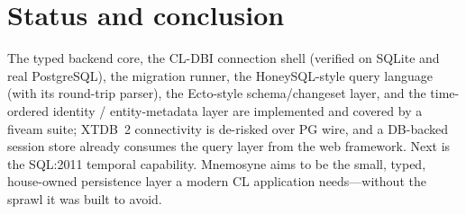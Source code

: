 \documentclass[11pt,a4paper]{article}
\begin{document}
\section{Status and conclusion}
\label{sec:conclusion}
The typed backend core, the CL-DBI connection shell (verified on SQLite and real
PostgreSQL), the migration runner, the HoneySQL-style query language (with its round-trip
parser), the Ecto-style schema/changeset layer, and the time-ordered identity / entity-metadata
layer are implemented and covered by a fiveam suite; XTDB~2 connectivity is de-risked over PG
wire, and a DB-backed session store already consumes the query layer from the web framework.
Next is the SQL:2011 temporal capability. Mnemosyne aims to be the small, typed, house-owned
persistence layer a modern CL application needs---without the sprawl it was built to avoid.



\end{document}
